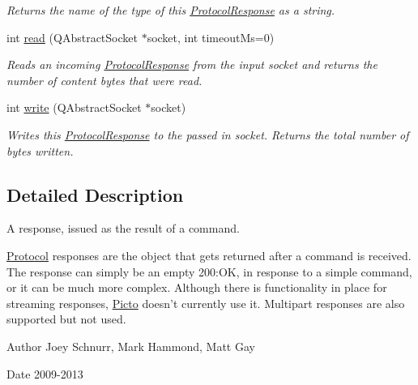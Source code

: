 \begin{DoxyCompactItemize}
\begin{DoxyCompactList}\small\item\em Returns the name of the type of this \hyperlink{struct_picto_1_1_protocol_response}{Protocol\-Response} as a string. \end{DoxyCompactList}\item 
int \hyperlink{struct_picto_1_1_protocol_response_ace13e43b1f086e84cf6f9d782fe1ce70}{read} (Q\-Abstract\-Socket $\ast$socket, int timeout\-Ms=0)
\begin{DoxyCompactList}\small\item\em Reads an incoming \hyperlink{struct_picto_1_1_protocol_response}{Protocol\-Response} from the input socket and returns the number of content bytes that were read. \end{DoxyCompactList}\item 
\hypertarget{struct_picto_1_1_protocol_response_a8ef58e6dae323f1258626b5825a52b24}{int \hyperlink{struct_picto_1_1_protocol_response_a8ef58e6dae323f1258626b5825a52b24}{write} (Q\-Abstract\-Socket $\ast$socket)}\label{struct_picto_1_1_protocol_response_a8ef58e6dae323f1258626b5825a52b24}

\begin{DoxyCompactList}\small\item\em Writes this \hyperlink{struct_picto_1_1_protocol_response}{Protocol\-Response} to the passed in socket. Returns the total number of bytes written. \end{DoxyCompactList}\end{DoxyCompactItemize}


\subsection{Detailed Description}
A response, issued as the result of a command. 

\hyperlink{struct_picto_1_1_protocol}{Protocol} responses are the object that gets returned after a command is received. The response can simply be an empty 200\-:O\-K, in response to a simple command, or it can be much more complex. Although there is functionality in place for streaming responses, \hyperlink{namespace_picto}{Picto} doesn't currently use it. Multipart responses are also supported but not used. \begin{DoxyAuthor}{Author}
Joey Schnurr, Mark Hammond, Matt Gay 
\end{DoxyAuthor}
\begin{DoxyDate}{Date}
2009-\/2013 
\end{DoxyDate}



